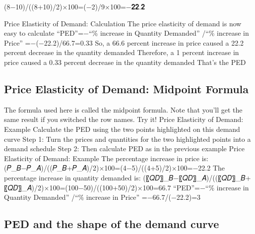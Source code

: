 \documentclass[
  letterpaper,
]{book}
\begin{document}
(8−10)/((8+10)/2)×100=(−2)/9×100=−𝟐𝟐.𝟐

Price Elasticity of Demand: Calculation The price elasticity of demand
is now easy to calculate ``PED''=−``\% increase in Quantity Demanded''
/``\% increase in Price'' =−(−22.2)/66.7=0.33 So, a 66.6 percent
increase in price caused a 22.2 percent decrease in the quantity
demanded Therefore, a 1 percent increase in price caused a 0.33 percent
decrease in the quantity demanded That's the PED

\subsection{Price Elasticity of Demand: Midpoint
Formula}\label{price-elasticity-of-demand-midpoint-formula}

The formula used here is called the midpoint formula. Note that you'll
get the same result if you switched the row names. Try it! Price
Elasticity of Demand: Example Calculate the PED using the two points
highlighted on this demand curve Step 1: Turn the prices and quantities
for the two highlighted points into a demand schedule Step 2: Then
calculate PED as in the previous example Price Elasticity of Demand:
Example The percentage increase in price is:
(𝑃\_𝐵−𝑃\_𝐴)/((𝑃\_𝐵+𝑃\_𝐴)/2)×100=(4−5)/((4+5)/2)×100=−22.2 The percentage
increase in quantity demanded is:
(〖𝑄𝐷〗\_𝐵−〖𝑄𝐷〗\_𝐴)/((〖𝑄𝐷〗\_𝐵+〖𝑄𝐷〗\_𝐴)/2)×100=(100−50)/((100+50)/2)×100=66.7
``PED''=−``\% increase in Quantity Demanded'' /``\% increase in Price''
=−66.7/(−22.2)=3

\subsection{PED and the shape of the demand
curve}\label{ped-and-the-shape-of-the-demand-curve}
\end{document}
